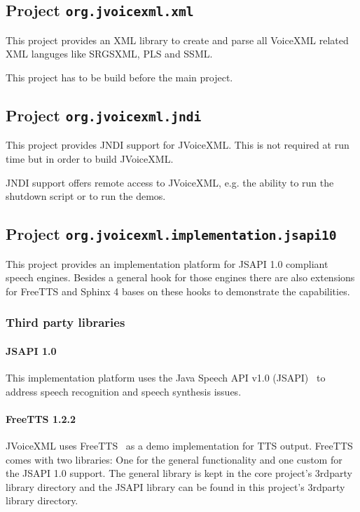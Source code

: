 \documentclass[11pt,a4paper]{article}
\begin{document}
\subsection{Project \lstinline{org.jvoicexml.xml}}
\label{sec:org.jvoicexml.xml}

This project provides an XML library to create and parse all VoiceXML related
XML languges like SRGSXML, PLS and SSML.

This project has to be build before the main project.

\subsection{Project \lstinline{org.jvoicexml.jndi}}

This project provides JNDI support for JVoiceXML. This is not required at run
time but in order to build JVoiceXML.

JNDI support offers remote access to JVoiceXML, e.g. the ability to run the
shutdown script or to run the demos.

\subsection{Project \lstinline{org.jvoicexml.implementation.jsapi10}}

This project provides an implementation platform for JSAPI 1.0 compliant
speech engines. Besides a general hook for those engines there are also
extensions for FreeTTS and Sphinx 4 bases on these hooks to demonstrate the
capabilities.

\subsubsection{Third party libraries}
\label{sec:jsapi10-third-party-libr}

\paragraph{JSAPI 1.0}

This implementation platform uses the Java Speech API v1.0
(JSAPI)~\cite{sun:jsapi} to address speech recognition and speech synthesis
issues.

\paragraph{FreeTTS 1.2.2}
\label{sec:freetts}

JVoiceXML uses FreeTTS~\cite{freetts} as a demo implementation for TTS output.
FreeTTS comes with two libraries: One for the general functionality
and one custom for the JSAPI 1.0 support.
The general library is kept in the core project's 3rdparty library directory
and the JSAPI library can be found in this project's 3rdparty library directory.
\end{document}
